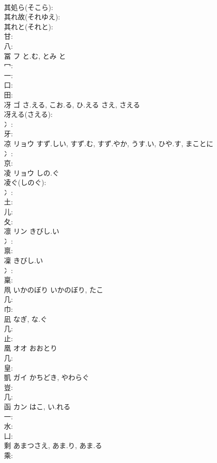 \documentclass[8pt]{extreport}
\begin{document}
\begin{CJK}{UTF8}{min}
\\	其処ら(そこら): 
\\	其れ故(それゆえ): 
\\	其れと(それと): 
\\	甘: 
\\	八: 
\\	冨	フ	と.む, とみ	と	
\\	冖: 
\\	一: 
\\	口: 
\\	田: 
\\	冴	ゴ	さ.える, こお.る, ひ.える	さえ, さえる	
\\	冴える(さえる): 
\\	冫: 
\\	牙: 
\\	凉	リョウ	すず.しい, すず.む, すず.やか, うす.い, ひや.す, まことに		
\\	冫: 
\\	京: 
\\	凌	リョウ	しの.ぐ		
\\	凌ぐ(しのぐ): 
\\	冫: 
\\	土: 
\\	儿: 
\\	夂: 
\\	凛	リン	きびし.い		
\\	冫: 
\\	禀: 
\\	凜		きびし.い				
\\	冫: 
\\	稟: 
\\	凧	いかのぼり	いかのぼり, たこ		
\\	几: 
\\	巾: 
\\	凪		なぎ, な.ぐ			
\\	几: 
\\	止: 
\\	凰	オオ	おおとり		
\\	几: 
\\	皇: 
\\	凱	ガイ	かちどき, やわらぐ		
\\	豈: 
\\	几: 
\\	函	カン	はこ, い.れる		
\\	一: 
\\	水: 
\\	凵: 
\\	剩		あまつさえ, あま.り, あま.る				
\\	乘: 

\end{CJK}
\end{document}
